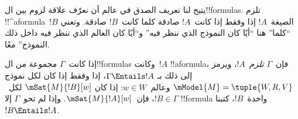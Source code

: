 \documentclass[../../../include/open-logic-section]{subfiles}
\begin{document}


\begin{explain}
  يتيح لنا تعريف الصدق في عالم أن نعرّف علاقة لزوم بين ال!!{formula}s.
  تلزم !!^a{formula}~$!B$ الصيغة~$!A$ إذا وفقط إذا كانت~$!A$
  صادقة كلما كانت~$!B$ صادقة. وتعني ``كلما'' هنا ``أيًا كان النموذج
  الذي ننظر فيه'' و``أيًا كان العالم الذي ننظر فيه داخل ذلك النموذج''
  معًا.
\end{explain}

\begin{defn}
  إذا كانت~$\Gamma$ مجموعة من ال!!{formula}s وكانت~$!A$ !!a{formula}،
  فإن~$\Gamma$ \emph{تلزم}~$!A$، ويرمز إلى ذلك بـ
  $\Gamma \Entails !A$، إذا وفقط إذا كان لكل نموذج
  $\mModel{M} = \tuple{W, R, V}$ وعالم~$w \in W$: إذا كان
  $\mSat{M}{!B}[w]$ لكل~$!B \in \Gamma$، فإن~$\mSat{M}{!A}[w]$.
  وإذا لم تحو~$\Gamma$ إلا !!{formula} واحدة~$!B$، كتبنا
  $!B \Entails !A$.
\end{defn}
\end{document}
